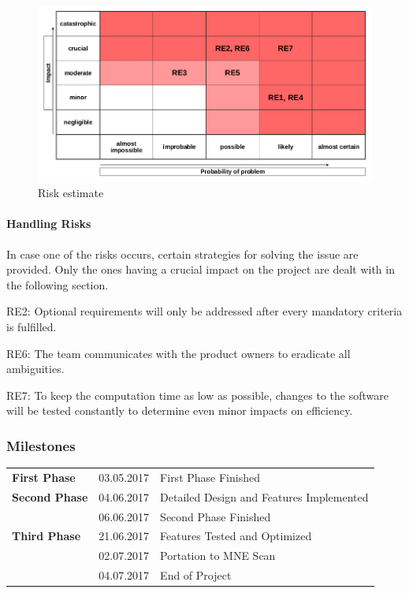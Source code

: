 \begin{figure}[h]
	\begin{center}
		\includegraphics[width= 15cm]{figures/risikoabschaetzung.png}
		\caption{Risk estimate}
	\end{center}
\end{figure}

\paragraph{Handling Risks}

In case one of the risks occurs, certain strategies for solving the issue are provided. Only the ones having a crucial impact on the project are dealt with in the following section. 

\begin{aims}
	
	\item[RE2:]Optional requirements will only be addressed after every mandatory criteria is fulfilled.
	\item[RE6:]The team communicates with the product owners to eradicate all ambiguities.
	\item[RE7:]To keep the computation time as low as possible, changes to the software will be tested constantly to 						   determine even minor impacts on efficiency. 	
	
\end{aims}

\clearpage

\subsubsection{Milestones}

\begin{tabular}{lll}
 	\textbf{First Phase} & 03.05.2017 & First Phase Finished\\
	\textbf{Second Phase} & 04.06.2017 & Detailed Design and Features Implemented\\
				& 06.06.2017 & Second Phase Finished\\
	\textbf{Third Phase} & 21.06.2017 & Features Tested and Optimized\\          
				& 02.07.2017 & Portation to MNE Scan\\
				& 04.07.2017 & End of Project\\
\end{tabular}

